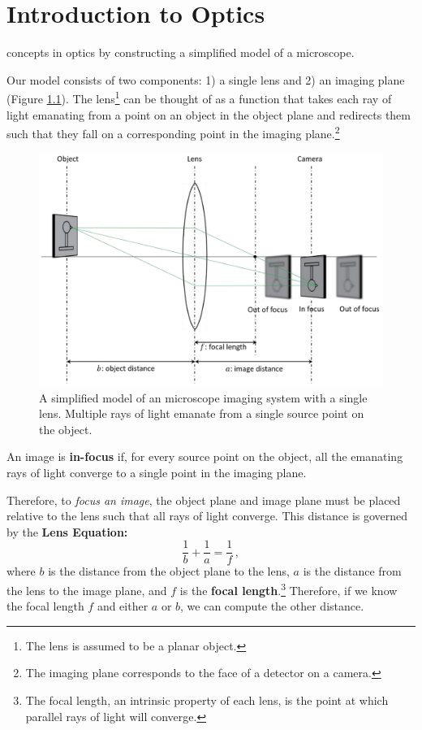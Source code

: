 \chapter{Introduction to Optics}
\label{chpt:optics}

 concepts in optics by constructing a simplified model of a microscope.

Our model consists of two components: 1) a single lens and 2) an imaging plane (Figure \ref{fig:lens-equation}).
The lens\footnote{The lens is assumed to be a planar object.} can be thought of as a function that takes each ray of light emanating from a point on an object in the object plane and redirects them such that they fall on a corresponding point in the imaging plane.\footnote{The imaging plane corresponds to the face of a detector on a camera.}

\begin{figure}[h!!!]
    \centering
    \includegraphics[width=\linewidth]{figs/lens-equation.png}
    \caption{A simplified model of an microscope imaging system with a single lens. Multiple rays of light emanate from a single source point on the object.}
    \label{fig:lens-equation}
\end{figure}

\begin{defn}[In-focus]
An image is \textbf{in-focus} if, for every source point on the object, all the emanating rays of light converge to a single point in the imaging plane.
\end{defn}

Therefore, to \textit{focus an image}, the object plane and image plane must be placed relative to the lens such that all rays of light converge.
This distance is governed by the \textbf{Lens Equation:}
\begin{equation}
    \label{eqn:lens}
    \frac{1}{b} + \frac{1}{a} = \frac{1}{f} \,,
\end{equation}
where $b$ is the distance from the object plane to the lens, $a$ is the distance from the lens to the image plane, and $f$ is the \textbf{focal length}.\footnote{The focal length, an intrinsic property of each lens, is the point at which parallel rays of light will converge.}
Therefore, if we know the focal length $f$ and either $a$ or $b$, we can compute the other distance.

